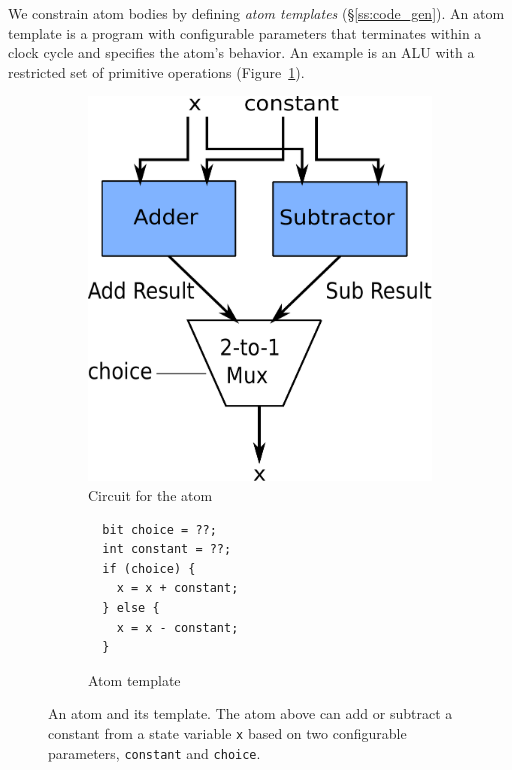 We constrain atom bodies by defining {\it atom templates}
(\S\ref{ss:code_gen}).  An atom template is a program with configurable
parameters that terminates within a clock cycle and specifies the atom's
behavior.  An example is an ALU with a restricted set of primitive operations
(Figure~\ref{fig:alu_diag}).



\begin{figure}[h]
  \begin{subfigure}{0.4\columnwidth}
  \includegraphics[width=\textwidth]{circuit.pdf}
  \caption{Circuit for the atom}
  \label{fig:alu_diag}
  \end{subfigure}
  \hspace{0.05\columnwidth}
  \begin{subfigure}{0.55\columnwidth}
  \begin{lstlisting}
  bit choice = ??;
  int constant = ??;
  if (choice) {
    x = x + constant;
  } else {
    x = x - constant;
  }
  \end{lstlisting}
  \caption{Atom template}
  \label{fig:alu_in_sketch}
  \end{subfigure}
  \caption{An atom and its template. The atom above can add or subtract a constant from a state
  variable {\tt x} based on two configurable parameters, {\tt constant} and {\tt choice}.}
  \label{fig:atom}
\end{figure}

